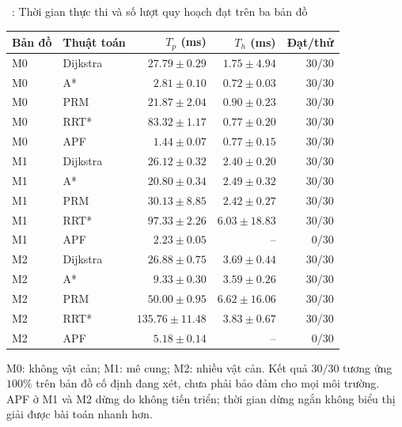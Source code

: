 \begin{center}
\begin{minipage}{\linewidth}
  \centering
  \singlespacing
  \label{tab:so-sanh-nam-thuat-toan}
  \tablename~\thetable: Thời gian thực thi và số lượt quy hoạch đạt trên ba bản đồ\par\smallskip
  \small
  \renewcommand{\arraystretch}{1.16}
  \begin{tabular}{@{}llrrr@{}}
    \toprule
    \textbf{Bản đồ} & \textbf{Thuật toán} & \(T_p\) \textbf{(ms)} & \(T_h\) \textbf{(ms)} & \textbf{Đạt/thử}\\
    \midrule
    M0 & Dijkstra & \(27.79\pm0.29\) & \(1.75\pm4.94\) & 30/30\\
    M0 & A* & \(2.81\pm0.10\) & \(0.72\pm0.03\) & 30/30\\
    M0 & PRM & \(21.87\pm2.04\) & \(0.90\pm0.23\) & 30/30\\
    M0 & RRT* & \(83.32\pm1.17\) & \(0.77\pm0.20\) & 30/30\\
    M0 & APF & \(1.44\pm0.07\) & \(0.77\pm0.15\) & 30/30\\
    \midrule
    M1 & Dijkstra & \(26.12\pm0.32\) & \(2.40\pm0.20\) & 30/30\\
    M1 & A* & \(20.80\pm0.34\) & \(2.49\pm0.32\) & 30/30\\
    M1 & PRM & \(30.13\pm8.85\) & \(2.42\pm0.27\) & 30/30\\
    M1 & RRT* & \(97.33\pm2.26\) & \(6.03\pm18.83\) & 30/30\\
    M1 & APF & \(2.23\pm0.05\) & -- & 0/30\\
    \midrule
    M2 & Dijkstra & \(26.88\pm0.75\) & \(3.69\pm0.44\) & 30/30\\
    M2 & A* & \(9.33\pm0.30\) & \(3.59\pm0.26\) & 30/30\\
    M2 & PRM & \(50.00\pm0.95\) & \(6.62\pm16.06\) & 30/30\\
    M2 & RRT* & \(135.76\pm11.48\) & \(3.83\pm0.67\) & 30/30\\
    M2 & APF & \(5.18\pm0.14\) & -- & 0/30\\
    \bottomrule
  \end{tabular}
  \par\smallskip
  \begin{minipage}{0.96\linewidth}
    \footnotesize M0: không vật cản; M1: mê cung; M2: nhiều vật cản. Kết quả \(30/30\) tương ứng \(100\%\) trên bản đồ cố định đang xét, chưa phải bảo đảm cho mọi môi trường. APF ở M1 và M2 dừng do không tiến triển; thời gian dừng ngắn không biểu thị giải được bài toán nhanh hơn.
  \end{minipage}
\end{minipage}
\end{center}


